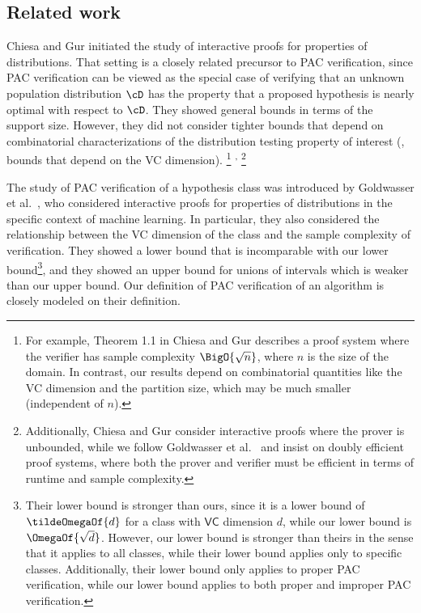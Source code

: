 %
\subsection{Related work}  %

Chiesa and Gur \cite{ChiesaG18} initiated the study of interactive proofs for properties of distributions. That setting is a closely related precursor to PAC verification, since PAC verification can be viewed as the special case of verifying that an unknown population distribution $\cD$ has the property that a proposed hypothesis is nearly optimal with respect to $\cD$.
They showed general bounds in terms of the support size. However, they did not consider tighter bounds that depend on combinatorial characterizations of the distribution testing property of interest (\eg, bounds that depend on the VC dimension).%
\footnote{
	For example, Theorem 1.1 in Chiesa and Gur \cite{ChiesaG18} describes a proof system where the verifier has sample complexity $\BigO{\sqrt{n}}$, where $n$ is the size of the domain. In contrast, our results depend on combinatorial quantities like the VC dimension and the partition size, which may be much smaller (independent of $n$).
}%
\textsuperscript{,}%
\footnote{
	Additionally, Chiesa and Gur \cite{ChiesaG18} consider interactive proofs where the prover is unbounded, while we follow Goldwasser et al.\ \cite{GoldwasserRSY21} and insist on doubly efficient proof systems, where both the prover and verifier must be efficient in terms of runtime and sample complexity.
}

The study of PAC verification of a hypothesis class was introduced by Goldwasser et al.\ \cite{GoldwasserRSY21}, who considered interactive proofs for properties of distributions in the specific context of machine learning. In particular, they also considered the relationship between the VC dimension of the class and the sample complexity of verification. They showed a lower bound that is incomparable with our lower bound\footnote{%
	Their lower bound is stronger than ours, since it is a lower bound of $\tildeOmegaOf{d}$ for a class with $\mathsf{VC}$ dimension $d$, while our lower bound is $\OmegaOf{\sqrt{d}}$. However, our lower bound is stronger than theirs in the sense that it applies to all classes, while their lower bound applies only to specific classes. Additionally, their lower bound only applies to proper PAC verification, while our lower bound applies to both proper and improper PAC verification.%
}, and they showed an upper bound for unions of intervals which is weaker than our upper bound. Our definition of PAC verification of an algorithm is closely modeled on their definition.

